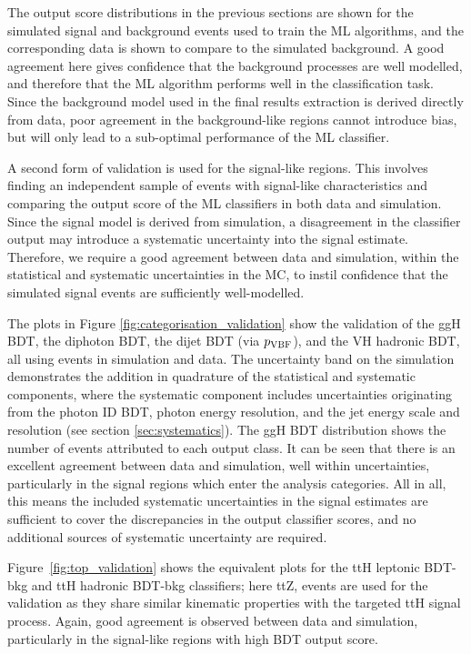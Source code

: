 The output score distributions in the previous sections are shown for the simulated signal and background events used to train the ML algorithms, and the corresponding data is shown to compare to the simulated background. A good agreement here gives confidence that the background processes are well modelled, and therefore that the ML algorithm performs well in the classification task. Since the background model used in the final results extraction is derived directly from data, poor agreement in the background-like regions cannot introduce bias, but will only lead to a sub-optimal performance of the ML classifier. 

A second form of validation is used for the signal-like regions. This involves finding an independent sample of events with signal-like characteristics and comparing the output score of the ML classifiers in both data and simulation. Since the signal model is derived from simulation, a disagreement in the classifier output may introduce a systematic uncertainty into the signal estimate. Therefore, we require a good agreement between data and simulation, within the statistical and systematic uncertainties in the MC, to instil confidence that the simulated signal events are sufficiently well-modelled.

The plots in Figure \ref{fig:categorisation_validation} show the validation of the ggH BDT, the diphoton BDT, the dijet BDT (via $p_{\rm{VBF}}$), and the VH hadronic BDT, all using \Zee events in simulation and data. The uncertainty band on the simulation demonstrates the addition in quadrature of the statistical and systematic components, where the systematic component includes uncertainties originating from the photon ID BDT, photon energy resolution, and the jet energy scale and resolution (see section \ref{sec:systematics}). The ggH BDT distribution shows the number of events attributed to each output class. It can be seen that there is an excellent agreement between data and simulation, well within uncertainties, particularly in the signal regions which enter the analysis categories. All in all, this means the included systematic uncertainties in the signal estimates are sufficient to cover the discrepancies in the output classifier scores, and no additional sources of systematic uncertainty are required. 

Figure~\ref{fig:top_validation} shows the equivalent plots for the ttH leptonic BDT-bkg and ttH hadronic BDT-bkg classifiers; here ttZ, \Zee events are used for the validation as they share similar kinematic properties with the targeted ttH signal process. Again, good agreement is observed between data and simulation, particularly in the signal-like regions with high BDT output score.

